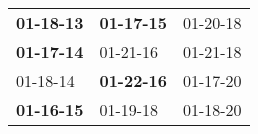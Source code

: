 \begin{supertabular}{p{0.33\columnwidth}p{0.33\columnwidth}p{0.33\columnwidth}}
 \textbf{01-18-13\textsuperscript{}} &  \textbf{01-17-15\textsuperscript{}} &  01-20-18\textsuperscript{} \\
 \textbf{01-17-14\textsuperscript{}} &           01-21-16\textsuperscript{} &  01-21-18\textsuperscript{} \\
          01-18-14\textsuperscript{} &  \textbf{01-22-16\textsuperscript{}} &  01-17-20\textsuperscript{} \\
 \textbf{01-16-15\textsuperscript{}} &           01-19-18\textsuperscript{} &  01-18-20\textsuperscript{} \\
\end{supertabular}
